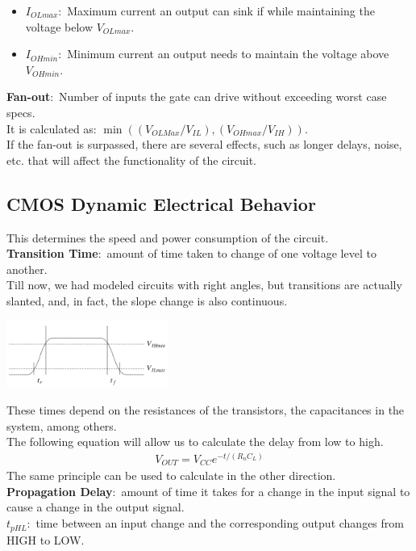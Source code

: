 \documentclass[nobib]{tufte-handout}
\newcommand{\defn}[2]{\noindent\textbf{#1}:\ #2}
\begin{document}
\begin{itemize}
    \item \defn{$I_{OLmax}$}{Maximum current an output can sink if while maintaining the voltage below $V_{OLmax}$.}
    \item \defn{$I_{OHmin}$}{Minimum current an output needs to maintain the voltage above $V_{OHmin}$.}
\end{itemize}
\defn{Fan-out}{Number of inputs the gate can drive without exceeding worst case specs.}\\
It is calculated as: $\min((V_{OLMax}/V_{IL}), (V_{OHmax}/V_{IH}))$.\\
If the fan-out is surpassed, there are several effects, such as longer delays, noise, etc. that will affect the functionality of the circuit.
\subsection{CMOS Dynamic Electrical Behavior}
This determines the speed and power consumption of the circuit.\\
\defn{Transition Time}{amount of time taken to change of one voltage level to another.}\\
Till now, we had modeled circuits with right angles, but transitions are actually slanted, and, in fact, the slope change is also continuous.\\
\begin{center}
    \includegraphics[width = 200px]{images/tdelaygraph.png}
\end{center}
These times depend on the resistances of the transistors, the capacitances in the system, among others.\\
The following equation will allow us to calculate the delay from low to high.
\begin{align*}
    V_{OUT} = V_{CC}e^{-t/(R_n C_L)}
\end{align*}
The same principle can be used to calculate in the other direction.\\
\defn{Propagation Delay}{amount of time it takes for a change in the input signal to cause a change in the output signal.}\\
\defn{$t_{pHL}$}{time between an input change and the corresponding output changes from HIGH to LOW.}\\
\end{document}
